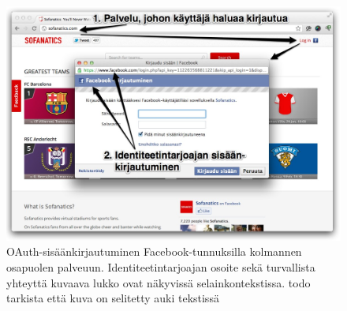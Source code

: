 \documentclass[finnish,gradu]{tktltiki}
\begin{document}
  \begin{figure}
    \centering
    \includegraphics[width=1.0\textwidth]{images/facebook_popup_login.jpg}
    \caption{OAuth-sisäänkirjautuminen Facebook-tunnuksilla kolmannen osapuolen palveuun. Identiteetintarjoajan osoite sekä turvallista yhteyttä kuvaava lukko ovat näkyvissä selainkontekstissa. todo tarkista että kuva on selitetty auki tekstissä}
    \label{fig:facebook_oauth_login}
  \end{figure}
\end{document}
